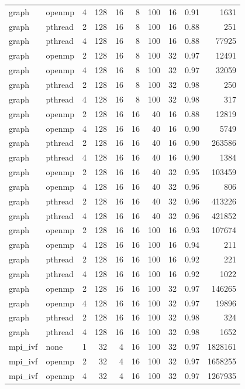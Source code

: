 \documentclass[a4paper]{article}
\begin{document}
{\begin{longtable}{lllrrrrrrr}
graph & openmp & 4 & 128 & 16 & 8 & 100 & 16 & 0.91 & 1631 \\
graph & pthread & 2 & 128 & 16 & 8 & 100 & 16 & 0.88 & 251 \\
graph & pthread & 4 & 128 & 16 & 8 & 100 & 16 & 0.88 & 77925 \\
graph & openmp & 2 & 128 & 16 & 8 & 100 & 32 & 0.97 & 12491 \\
graph & openmp & 4 & 128 & 16 & 8 & 100 & 32 & 0.97 & 32059 \\
graph & pthread & 2 & 128 & 16 & 8 & 100 & 32 & 0.98 & 250 \\
graph & pthread & 4 & 128 & 16 & 8 & 100 & 32 & 0.98 & 317 \\
graph & openmp & 2 & 128 & 16 & 16 & 40 & 16 & 0.88 & 12819 \\
graph & openmp & 4 & 128 & 16 & 16 & 40 & 16 & 0.90 & 5749 \\
graph & pthread & 2 & 128 & 16 & 16 & 40 & 16 & 0.90 & 263586 \\
graph & pthread & 4 & 128 & 16 & 16 & 40 & 16 & 0.90 & 1384 \\
graph & openmp & 2 & 128 & 16 & 16 & 40 & 32 & 0.95 & 103459 \\
graph & openmp & 4 & 128 & 16 & 16 & 40 & 32 & 0.96 & 806 \\
graph & pthread & 2 & 128 & 16 & 16 & 40 & 32 & 0.96 & 413226 \\
graph & pthread & 4 & 128 & 16 & 16 & 40 & 32 & 0.96 & 421852 \\
graph & openmp & 2 & 128 & 16 & 16 & 100 & 16 & 0.93 & 107674 \\
graph & openmp & 4 & 128 & 16 & 16 & 100 & 16 & 0.94 & 211 \\
graph & pthread & 2 & 128 & 16 & 16 & 100 & 16 & 0.92 & 221 \\
graph & pthread & 4 & 128 & 16 & 16 & 100 & 16 & 0.92 & 1022 \\
graph & openmp & 2 & 128 & 16 & 16 & 100 & 32 & 0.97 & 146265 \\
graph & openmp & 4 & 128 & 16 & 16 & 100 & 32 & 0.97 & 19896 \\
graph & pthread & 2 & 128 & 16 & 16 & 100 & 32 & 0.98 & 324 \\
graph & pthread & 4 & 128 & 16 & 16 & 100 & 32 & 0.98 & 1652 \\
mpi\_ivf & none & 1 & 32 & 4 & 16 & 100 & 32 & 0.97 & 1828161 \\
mpi\_ivf & openmp & 2 & 32 & 4 & 16 & 100 & 32 & 0.97 & 1658255 \\
mpi\_ivf & openmp & 4 & 32 & 4 & 16 & 100 & 32 & 0.97 & 1267935 \\

\end{longtable}}
\end{document}
